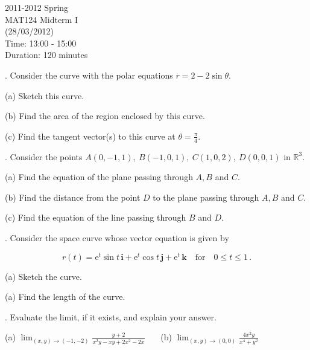 \documentclass{article}
\begin{document}
\pagestyle{empty}
\large

\begin{center}
2011-2012 Spring \\MAT124 Midterm I\\(28/03/2012)\\Time: 13:00 - 15:00\\Duration: 120 minutes
\end{center}

. Consider the curve with the polar equations $r=2-2\sin\theta$.

\hfill

(a) Sketch this curve.

\hfill

(b) Find the area of the region enclosed by this curve.

\hfill

(c) Find the tangent vector(s) to this curve at $\displaystyle\theta=\frac\pi4$.

\hfill

. Consider the points $A(0,-1,1),\:B(-1,0,1),\:C(1,0,2),\:D(0,0,1)$  in $\mathbb{R}^3$.

\hfill

(a) Find the equation of the plane passing through $A, B$ and $C$.

\hfill

(b) Find the distance from the point $D$ to the plane passing through $A, B$ and $C$.

\hfill

(c) Find the equation of the line passing through $B$ and $D$.

\hfill

. Consider the space curve whose vector equation is given by

\[r(t)=\mathrm{e}^t\sin t\,\mathbf{i}+\mathrm{e}^t\cos t\,\mathbf{j}+\mathrm{e}^t\,\mathbf{k} \quad\text{for}\quad 0\leq t\leq1\,.\]

\hfill

(a) Sketch the curve.

\hfill

(a) Find the length of the curve.

\hfill

. Evaluate the limit, if it exists, and explain your answer.

\hfill

(a) $\displaystyle \lim_{(x,y)\to(-1,-2)}\frac{y+2}{x^2y-xy+2x^2-2x}$ \ \ \ (b) $\displaystyle\lim_{(x,y)\to(0,0)}\frac{4x^2y}{x^4+y^2}$
\end{document}
